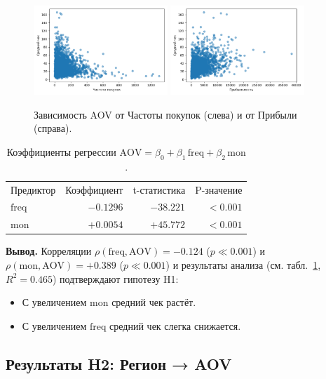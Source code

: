 \documentclass[a4paper]{article}
\begin{document}
\begin{figure}[H]
  \centering
  \includegraphics[width=0.45\textwidth]{img/freq_vs_aov.png}
  \includegraphics[width=0.45\textwidth]{img/mon_vs_aov.png}
  \caption{Зависимость AOV от Частоты покупок (слева) и от Прибыли (справа).}
  \label{fig:h1_scatter}
\end{figure}

\begin{table}[H]
  \centering
  \begin{tabular}{lrrr}
    Предиктор & Коэффициент & t-статистика & P-значение \\
    \(\mathrm{freq}\) & \(-0.1296\) & \(-38.221\) & \(<0.001\) \\
    \(\mathrm{mon}\)  & \(+0.0054\) & \(+45.772\) & \(<0.001\) \\
  \end{tabular}
  \caption{Коэффициенты регрессии \(\mathrm{AOV} = \beta_0 + \beta_1\,\mathrm{freq} + \beta_2\,\mathrm{mon}\).}
  \label{tab:h1_coef}
\end{table}

\noindent
\textbf{Вывод.} Корреляции \(\rho(\text{freq},\text{AOV})=-0.124\) (\(p\ll0.001\)) и \(\rho(\text{mon},\text{AOV})=+0.389\) (\(p\ll0.001\)) и результаты анализа (см. табл.~\ref{tab:h1_coef}, \(R^2=0.465\)) подтверждают гипотезу H1:  
\begin{itemize}
  \item С увеличением \(\mathrm{mon}\) средний чек растёт.
  \item С увеличением \(\mathrm{freq}\) средний чек слегка снижается.
\end{itemize}

\subsection{Результаты H2: Регион → AOV}
\end{document}
